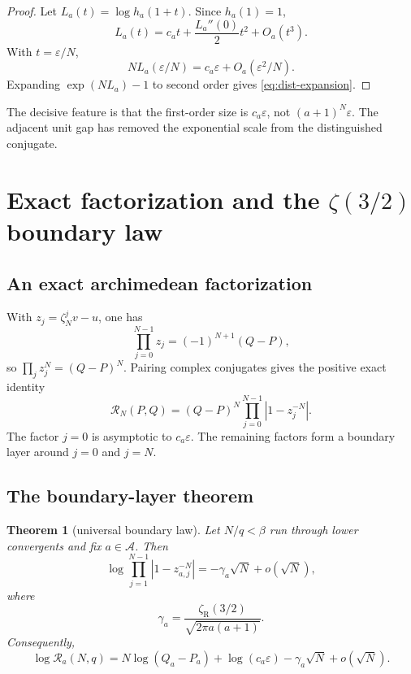 \documentclass[11pt]{article}
\newtheorem{theorem}{Theorem}[section]
\theoremstyle{definition}
\theoremstyle{remark}
\newcommand{\eps}{\varepsilon}
\newcommand{\zR}{\zeta_{\!\mathrm R}}
\begin{document}
\begin{proof}
Let \(L_a(t)=\log h_a(1+t)\).  Since \(h_a(1)=1\),
\[
L_a(t)=c_at+\frac{L_a''(0)}2t^2+O_a(t^3).
\]
With \(t=\eps/N\),
\[
N L_a(\eps/N)
=c_a\eps+O_a(\eps^2/N).
\]
Expanding \(\exp(NL_a)-1\) to second order gives \eqref{eq:dist-expansion}.
\end{proof}

The decisive feature is that the first-order size is \(c_a\eps\), not
\((a+1)^N\eps\).  The adjacent unit gap has removed the exponential scale from the distinguished conjugate.

\section{Exact factorization and the \texorpdfstring{$\zeta(3/2)$}{zeta(3/2)} boundary law}\label{sec:boundary}

\subsection{An exact archimedean factorization}
With \(z_j=\zeta_N^jv-u\), one has
\[
\prod_{j=0}^{N-1}z_j=(-1)^{N+1}(Q-P),
\]
so \(\prod_j z_j^N=(Q-P)^N\).  Pairing complex conjugates gives the positive exact identity
\begin{equation}\label{eq:factorization}
\mathscr R_N(P,Q)
=(Q-P)^N\prod_{j=0}^{N-1}\left|1-z_j^{-N}\right|.
\end{equation}
The factor \(j=0\) is asymptotic to \(c_a\eps\).  The remaining factors form a boundary layer around \(j=0\) and \(j=N\).

\subsection{The boundary-layer theorem}

\begin{theorem}[universal boundary law]\label{thm:boundary}
Let \(N/q<\beta\) run through lower convergents and fix \(a\in\mathcal A\).  Then
\begin{equation}\label{eq:boundary-law}
\log\prod_{j=1}^{N-1}\left|1-z_{a,j}^{-N}\right|
=-\gamma_a\sqrt N+o(\sqrt N),
\end{equation}
where
\begin{equation}\label{eq:gamma}
\gamma_a=\frac{\zR(3/2)}{\sqrt{2\pi a(a+1)}}.
\end{equation}
Consequently,
\begin{equation}\label{eq:full-asymptotic}
\boxed{\quad
\log\mathscr R_a(N,q)
=N\log(Q_a-P_a)+\log(c_a\eps)
-\gamma_a\sqrt N+o(\sqrt N).
\quad}
\end{equation}
\end{theorem}
\end{document}
